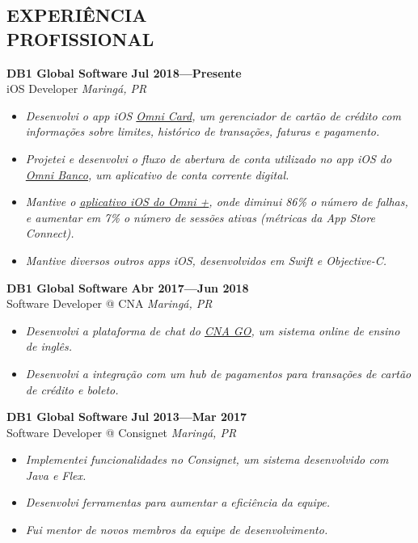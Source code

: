 \documentclass[line,margin]{res}
\begin{document}


\address{\sl \href{https://marcosatanaka.com}{marcosatanaka.com} --- \href{mailto:marcosatanaka@gmail.com}{marcosatanaka@gmail.com}}


\begin{resume}


\section{EXPERIÊNCIA \\ PROFISSIONAL}
  {\bf DB1 Global Software} \hfill {\bf Jul 2018---Presente} \\
  iOS Developer \hfill {\sl Maring\'a, PR}\\[-6pt]
  \begin{itemize}
    \item {\sl Desenvolvi o app iOS \href{https://apps.apple.com/us/app/id1490242421}{Omni Card}, um gerenciador de cartão de crédito com informações sobre limites, histórico de transações, faturas e pagamento.}
    \item {\sl Projetei e desenvolvi o fluxo de abertura de conta utilizado no app iOS do \href{https://apps.apple.com/br/app/omni-banco/id1369601365}{Omni Banco}, um aplicativo de conta corrente digital.}
    \item {\sl Mantive o \href{https://apps.apple.com/br/app/omni/id1276332750}{aplicativo iOS do Omni +}, onde diminui 86\% o número de falhas, e aumentar em 7\% o número de sessões ativas (métricas da App Store Connect).}
    \item {\sl Mantive diversos outros apps iOS, desenvolvidos em Swift e Objective-C.}
  \end{itemize}

  {\bf DB1 Global Software} \hfill {\bf Abr 2017---Jun 2018} \\
  Software Developer @ CNA \hfill {\sl Maring\'a, PR}\\[-6pt]
  \begin{itemize}
    \item {\sl Desenvolvi a plataforma de chat do \href{https://www.cnago.com.br}{CNA GO}, um sistema online de ensino de inglês.}
    \item {\sl Desenvolvi a integração com um hub de pagamentos para transações de cartão de crédito e boleto.}
  \end{itemize}

  {\bf DB1 Global Software} \hfill {\bf Jul 2013---Mar 2017} \\
  Software Developer @ Consignet \hfill {\sl Maring\'a, PR}\\[-6pt]
  \begin{itemize}
    \item {\sl Implementei funcionalidades no Consignet, um sistema desenvolvido com Java e Flex.}
    \item {\sl Desenvolvi ferramentas para aumentar a eficiência da equipe.}
    \item {\sl Fui mentor de novos membros da equipe de desenvolvimento.}
  \end{itemize}


\end{resume}
\end{document}
